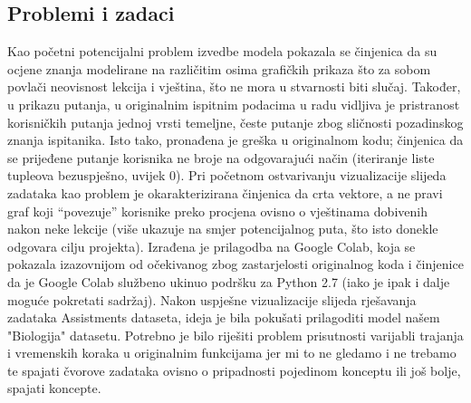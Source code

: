 \subsection{Problemi i zadaci}
Kao početni potencijalni problem izvedbe modela pokazala se činjenica da su ocjene znanja modelirane na različitim osima grafičkih prikaza što za sobom povlači neovisnost lekcija i vještina, što ne mora u stvarnosti biti slučaj. Također, u prikazu putanja, u originalnim ispitnim podacima u radu vidljiva je pristranost korisničkih putanja jednoj vrsti temeljne, česte putanje zbog sličnosti pozadinskog znanja ispitanika.\newline
Isto tako, pronađena je greška u originalnom kodu; činjenica da se prijeđene putanje korisnika ne broje na odgovarajući način (iteriranje liste tupleova bezuspješno, uvijek 0).\newline
Pri početnom ostvarivanju vizualizacije slijeda zadataka kao problem je okarakterizirana činjenica da crta vektore, a ne pravi graf koji “povezuje” korisnike preko procjena ovisno o vještinama dobivenih nakon neke lekcije (više ukazuje na smjer potencijalnog puta, što isto donekle odgovara cilju projekta).\newline 
Izrađena je prilagodba na Google Colab, koja se pokazala izazovnijom od očekivanog zbog zastarjelosti originalnog koda i činjenice da je Google Colab službeno ukinuo podršku za Python 2.7 (iako je ipak i dalje moguće pokretati sadržaj).\newline
Nakon uspješne vizualizacije slijeda rješavanja zadataka Assistments dataseta, ideja je bila pokušati prilagoditi model našem "Biologija" datasetu. Potrebno je bilo riješiti problem prisutnosti varijabli trajanja i vremenskih koraka u originalnim funkcijama jer mi to ne gledamo i ne trebamo te spajati čvorove zadataka ovisno o pripadnosti pojedinom konceptu ili još bolje, spajati koncepte. 

